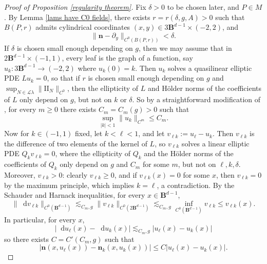 \documentclass[reqno,11pt]{amsart}
\newcommand{\Ball}{\mathbf{B}}
\newcommand*\dif{\mathop{}\!\mathrm{d}}
\newcommand{\Leaves}{\mathscr L}
\newcommand{\Two}{\mathrm{I\!I}}
\newcommand{\normal}{\mathbf n}
\theoremstyle{definition}
\numberwithin{equation}{section}
\begin{document}
\begin{proof}[Proof of Proposition \ref{regularity theorem}]
Fix $\delta > 0$ to be chosen later, and $P \in M$.
By Lemma \ref{lams have C0 fields}, there exists $r = r(\delta, g, A) > 0$ such that $B(P, r)$ admits cylindrical coordinates $(x, y) \in 3\Ball^{d - 1} \times (-2, 2)$, and
\begin{equation}\label{normal is almost constant}
\|\normal - \partial_y\|_{C^0(B(P, r))} < \delta.
\end{equation}
If $\delta$ is chosen small enough depending on $g$, then we may assume that in $2\Ball^{d - 1} \times (-1, 1)$,
every leaf is the graph of a function, say $u_k: 3\Ball^{d - 1} \to (-2, 2)$ where $u_k(0) = k$.
Then $u_k$ solves a quasilinear elliptic PDE $Lu_k = 0$, so that if $r$ is chosen small enough depending on $g$ and $\sup_{N \in \Leaves \lambda} \|\Two_N\|_{C^0}$, then the ellipticity of $L$ and H\"older norms of the coefficients of $L$ only depend on $g$, but not on $k$ or $\delta$.
So by a straightforward modification of \cite[Corollary 16.7]{gilbarg2015elliptic}, for every $m \geq 0$ there exists $C_m = C_m(g) > 0$ such that
\begin{equation}\label{norms on uk}
\sup_{|k| < 1} \|u_k\|_{C^m} \leq C_m.
\end{equation}
Now for $k \in (-1, 1)$ fixed, let $k < \ell < 1$, and let $v_{\ell k} := u_\ell - u_k$.
Then $v_{\ell k}$ is the difference of two elements of the kernel of $L$, so $v_{\ell k}$ solves a linear elliptic PDE $Q_k v_{\ell k} = 0$, where the ellipticity of $Q_k$ and the H\"older norms of the coefficients of $Q_k$ only depend on $g$ and $C_m$ for some $m$, but not on $\ell, k, \delta$.
Moreover, $v_{\ell k} > 0$: clearly $v_{\ell k} \geq 0$, and if $v_{\ell k}(x) = 0$ for some $x$, then $v_{\ell k} = 0$ by the maximum principle, which implies $k = \ell$, a contradiction.
By the Schauder \cite[Theorem 6.2]{gilbarg2015elliptic} and Harnack \cite[Theorem 9.25]{gilbarg2015elliptic} inequalities, for every $x \in \Ball^{d - 1}$,
\begin{equation}\label{Schauder Harnack}
	\|\dif v_{\ell k}\|_{C^0(\Ball^{d - 1})} \lesssim_{C_m, g} \|v_{\ell k}\|_{C^0(2 \Ball^{d - 1})} \lesssim_{C_m, g} \inf_{C^0(\Ball^{d - 1})} v_{\ell k} \leq v_{\ell k}(x).
\end{equation}
In particular, for every $x$,
$$|\dif u_\ell(x) - \dif u_k(x)| \lesssim_{C_m, g} |u_\ell(x) - u_k(x)|$$
so there exists $C = C'(C_m, g)$ such that
\begin{equation}\label{vertical Lipschitz}
|\normal(x, u_\ell(x)) - \normal_k(x, u_k(x))| \leq C |u_\ell(x) - u_k(x)|.
\end{equation}


\end{proof}
\end{document}
